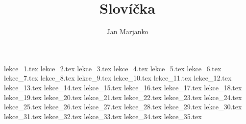 \documentclass[article]{jlreq}
\title{Slovíčka}
\author{Jan Marjanko}
\begin{document}
\maketitle
\tableofcontents
\newpage

{lekce_1.tex}
{lekce_2.tex}
{lekce_3.tex}
{lekce_4.tex}
{lekce_5.tex}
{lekce_6.tex}
{lekce_7.tex}
{lekce_8.tex}
{lekce_9.tex}
{lekce_10.tex}
{lekce_11.tex}
{lekce_12.tex}
{lekce_13.tex}
{lekce_14.tex}
{lekce_15.tex}
{lekce_16.tex}
{lekce_17.tex}
{lekce_18.tex}
{lekce_19.tex}
{lekce_20.tex}
{lekce_21.tex}
{lekce_22.tex}
{lekce_23.tex}
{lekce_24.tex}
{lekce_25.tex}
{lekce_26.tex}
{lekce_27.tex}
{lekce_28.tex}
{lekce_29.tex}
{lekce_30.tex}
{lekce_31.tex}
{lekce_32.tex}
{lekce_33.tex}
{lekce_34.tex}
{lekce_35.tex}
\end{document}
